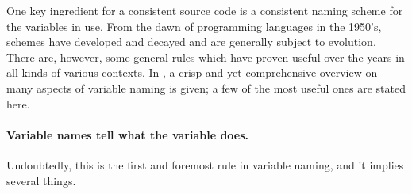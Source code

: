 One key ingredient for a consistent source code is a consistent naming scheme for the variables in use. From the dawn of programming languages in the 1950's, schemes have developed and decayed and are generally subject to evolution. There are, however, some general rules which have proven useful over the years in all kinds of various contexts. In \cite{Johnson:2002:MPS}, a crisp and yet comprehensive overview on many aspects of variable naming is given; a few of the most useful ones are stated here.

\paragraph{Variable names tell what the variable does.} Undoubtedly, this is the first and foremost rule in variable naming, and it implies several things.

